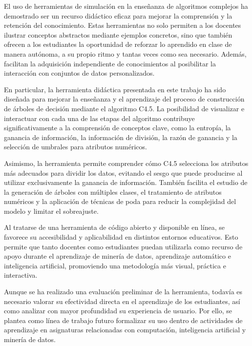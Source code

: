 
El uso de herramientas de simulación en la enseñanza de algoritmos complejos ha demostrado ser un recurso didáctico eficaz para mejorar la comprensión y la retención del conocimiento. Estas herramientas no solo permiten a los docentes ilustrar conceptos abstractos mediante ejemplos concretos, sino que también ofrecen a los estudiantes la oportunidad de reforzar lo aprendido en clase de manera autónoma, a su propio ritmo y tantas veces como sea necesario. Además, facilitan la adquisición independiente de conocimientos al posibilitar la interacción con conjuntos de datos personalizados.

En particular, la herramienta didáctica presentada en este trabajo ha sido diseñada para mejorar la enseñanza y el aprendizaje del proceso de construcción de árboles de decisión mediante el algoritmo C4.5. La posibilidad de visualizar e interactuar con cada una de las etapas del algoritmo contribuye significativamente a la comprensión de conceptos clave, como la entropía, la ganancia de información, la información de división, la razón de ganancia y la selección de umbrales para atributos numéricos.

Asimismo, la herramienta permite comprender cómo C4.5 selecciona los atributos más adecuados para dividir los datos, evitando el sesgo que puede producirse al utilizar exclusivamente la ganancia de información. También facilita el estudio de la generación de árboles con múltiples clases, el tratamiento de atributos numéricos y la aplicación de técnicas de poda para reducir la complejidad del modelo y limitar el sobreajuste.

Al tratarse de una herramienta de código abierto y disponible en línea, se favorece su accesibilidad y aplicabilidad en distintos entornos educativos. Esto permite que tanto docentes como estudiantes puedan utilizarla como recurso de apoyo durante el aprendizaje de minería de datos, aprendizaje automático e inteligencia artificial, promoviendo una metodología más visual, práctica e interactiva.

Aunque se ha realizado una evaluación preliminar de la herramienta, todavía es necesario valorar su efectividad directa en el aprendizaje de los estudiantes, así como analizar con mayor profundidad su experiencia de usuario. Por ello, se plantea como línea de trabajo futuro formalizar su uso dentro de actividades de aprendizaje en asignaturas relacionadas con computación, inteligencia artificial y minería de datos.

